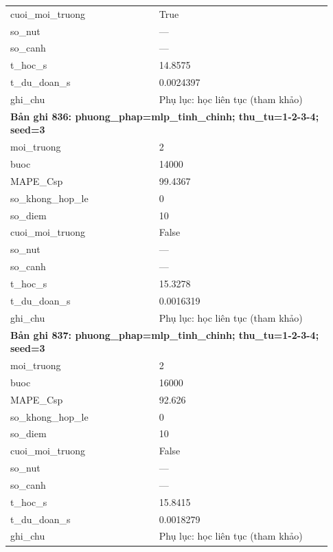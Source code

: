 \begin{longtable}{p{0.43\linewidth}p{0.50\linewidth}}
cuoi\_\allowbreak moi\_\allowbreak truong & True \\
so\_\allowbreak nut & — \\
so\_\allowbreak canh & — \\
t\_\allowbreak hoc\_\allowbreak s & 14.8575 \\
t\_\allowbreak du\_\allowbreak doan\_\allowbreak s & 0.0024397 \\
ghi\_\allowbreak chu & Phụ lục: học liên tục (tham khảo) \\
\midrule
\multicolumn{2}{p{0.95\linewidth}}{\textbf{Bản ghi 836: phuong\_phap=mlp\_tinh\_chinh; thu\_tu=1-2-3-4; seed=3}} \\
moi\_\allowbreak truong & 2 \\
buoc & 14000 \\
MAPE\_\allowbreak Csp & 99.4367 \\
so\_\allowbreak khong\_\allowbreak hop\_\allowbreak le & 0 \\
so\_\allowbreak diem & 10 \\
cuoi\_\allowbreak moi\_\allowbreak truong & False \\
so\_\allowbreak nut & — \\
so\_\allowbreak canh & — \\
t\_\allowbreak hoc\_\allowbreak s & 15.3278 \\
t\_\allowbreak du\_\allowbreak doan\_\allowbreak s & 0.0016319 \\
ghi\_\allowbreak chu & Phụ lục: học liên tục (tham khảo) \\
\midrule
\multicolumn{2}{p{0.95\linewidth}}{\textbf{Bản ghi 837: phuong\_phap=mlp\_tinh\_chinh; thu\_tu=1-2-3-4; seed=3}} \\
moi\_\allowbreak truong & 2 \\
buoc & 16000 \\
MAPE\_\allowbreak Csp & 92.626 \\
so\_\allowbreak khong\_\allowbreak hop\_\allowbreak le & 0 \\
so\_\allowbreak diem & 10 \\
cuoi\_\allowbreak moi\_\allowbreak truong & False \\
so\_\allowbreak nut & — \\
so\_\allowbreak canh & — \\
t\_\allowbreak hoc\_\allowbreak s & 15.8415 \\
t\_\allowbreak du\_\allowbreak doan\_\allowbreak s & 0.0018279 \\
ghi\_\allowbreak chu & Phụ lục: học liên tục (tham khảo) \\

\end{longtable}
